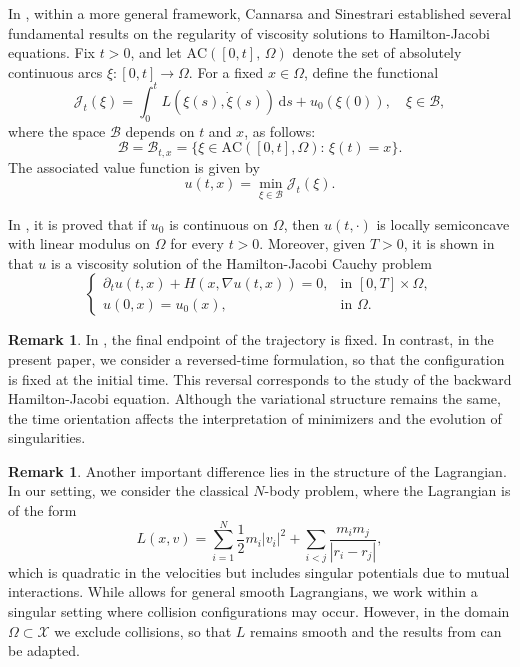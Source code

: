 \documentclass[a4paper,10pt]{amsart}
\newcommand{\ud}{\mathrm{d}}
\theoremstyle{plain}
\theoremstyle{definition}
\newtheorem{rem}[thm]{Remark}
\numberwithin{equation}{section}
\numberwithin{thm}{section}
\begin{document}
In \cite{MR2041617}, within a more general framework, Cannarsa and Sinestrari established several fundamental results on the regularity of viscosity solutions to Hamilton-Jacobi equations. Fix $t > 0$, and let $\mathrm{AC}([0,t],\,  \Omega)$ denote the set of absolutely continuous arcs $\xi:[0,t] \to  \Omega$. For a fixed $x \in \Omega$, define the functional
\begin{equation}\label{eq:value_function_CS}
    \mathcal{J}_t (\xi)=\int_{0}^{t}L(\xi(s),\dot \xi(s))\,\ud s + u_0(\xi(0)), \quad \xi \in \mathcal{B},
\end{equation}
where the space $\mathcal B$ depends on $t$ and $x$, as follows:
\[
\mathcal{B}=\mathcal B_{t,x} = \{\xi \in \mathrm{AC}([0,t], \Omega):\, \xi(t)=x\}.
\]
The associated value function is given by
\[
u(t,x)=\min_{\xi \in \mathcal{B}}\mathcal{J}_t(\xi).
\]

In \cite[Theorem 6.4.3]{MR2041617}, it is proved that if $u_0$ is continuous on $\Omega$, then $u(t,\cdot)$ is locally semiconcave with linear modulus on $\Omega$ for every $t > 0$. Moreover, given $T > 0$, it is shown in \cite[Theorem 6.4.5]{MR2041617} that $u$ is a viscosity solution of the Hamilton-Jacobi Cauchy problem
\begin{displaymath}
    \begin{cases}
\partial_t u(t,x)+H(x,\nabla u(t,x))=0, & \text{in } [0,T]\times \Omega, \\
u(0,x)=u_0(x), & \text{in } \Omega.
    \end{cases}
\end{displaymath}

\begin{rem}
    In \cite{MR2041617}, the final endpoint of the trajectory is fixed. In contrast, in the present paper, we consider a reversed-time formulation, so that the configuration is fixed at the initial time. This reversal corresponds to the study of the backward Hamilton-Jacobi equation. Although the variational structure remains the same, the time orientation affects the interpretation of minimizers and the evolution of singularities.
\end{rem}

\begin{rem}
    Another important difference lies in the structure of the Lagrangian. In our setting, we consider the classical $N$-body problem, where the Lagrangian is of the form
    \[
    L(x,v) = \sum_{i=1}^N \frac{1}{2} m_i |v_i|^2 + \sum_{i<j} \frac{m_i m_j}{|r_i - r_j|},
    \]
    which is quadratic in the velocities but includes singular potentials due to mutual interactions. While \cite{MR2041617} allows for general smooth Lagrangians, we work within a singular setting where collision configurations may occur. However, in the domain $\Omega \subset \mathcal{X}$ we exclude collisions, so that $L$ remains smooth and the results from \cite{MR2041617} can be adapted.
\end{rem}
\end{document}
